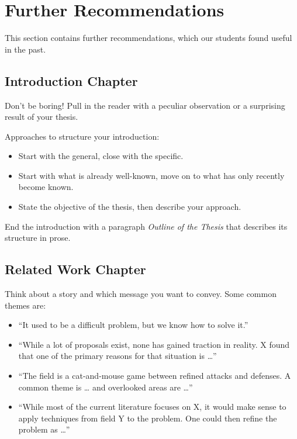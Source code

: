  
\chapter{Further Recommendations}

This section contains further recommendations, which our students found useful in the past.

\section{Introduction Chapter}

Don’t be boring! Pull in the reader with a peculiar observation or a surprising result of your thesis.

Approaches to structure your introduction:
\begin{itemize}
\item Start with the general, close with the specific.
\item Start with what is already well-known, move on to what has only recently become known.
\item State the objective of the thesis, then describe your approach.
\end{itemize}

End the introduction with a paragraph \emph{Outline of the Thesis} that describes its structure in prose.

\section{Related Work Chapter}

Think about a story and which message you want to convey. Some common themes are:
\begin{itemize}
\item “It used to be a difficult problem, but we know how to solve it.”
\item “While a lot of proposals exist, none has gained traction in reality. X found that one of the primary reasons for that situation is …”
\item “The field is a cat-and-mouse game between refined attacks and defenses. A common theme is … and overlooked areas are …”
\item “While most of the current literature focuses on X, it would make sense to apply techniques from field Y to the problem. One could then refine the problem as …”
\end{itemize}

